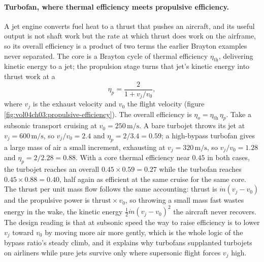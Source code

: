 \paragraph{Turbofan, where thermal efficiency meets propulsive efficiency.} A
jet engine converts fuel heat to a thrust that pushes an aircraft, and its useful
output is not shaft work but the rate at which thrust does work on the airframe,
so its overall efficiency is a product of two terms the earlier Brayton examples
never separated. The core is a Brayton cycle of thermal efficiency
$\eta_{\text{th}}$, delivering kinetic energy to a jet; the propulsion stage turns
that jet's kinetic energy into thrust work at a 
\[
\eta_p = \frac{2}{1 + v_j/v_0},
\]
where $v_j$ is the exhaust velocity and $v_0$ the flight velocity (figure
\ref{fig:vol04ch03:propulsive-efficiency}). The overall efficiency is
$\eta_o = \eta_{\text{th}}\,\eta_p$. Take a subsonic transport cruising at
$v_0 = 250\,\text{m}/\text{s}$. A bare turbojet throws its jet at
$v_j = 600\,\text{m}/\text{s}$, so $v_j/v_0 = 2.4$ and $\eta_p = 2/3.4 = 0.59$;
a high-bypass turbofan gives a large mass of air a small increment, exhausting at
$v_j = 320\,\text{m}/\text{s}$, so $v_j/v_0 = 1.28$ and $\eta_p = 2/2.28 = 0.88$.
With a core thermal efficiency near $0.45$ in both cases, the turbojet reaches an
overall $0.45 \times 0.59 = 0.27$ while the turbofan reaches $0.45 \times 0.88 =
0.40$, half again as efficient at the same cruise for the same core. The thrust
per unit mass flow follows the same accounting: thrust is $\dot m(v_j - v_0)$ and
the propulsive power is $\text{thrust} \times v_0$, so throwing a small mass fast
wastes energy in the wake, the kinetic energy $\tfrac12 \dot m(v_j - v_0)^2$ the
aircraft never recovers. The design reading is that at subsonic speed the way to
raise efficiency is to lower $v_j$ toward $v_0$ by moving more air more gently,
which is the whole logic of the bypass ratio's steady climb, and it explains why
turbofans supplanted turbojets on airliners while pure jets survive only where
supersonic flight forces $v_j$ high.



